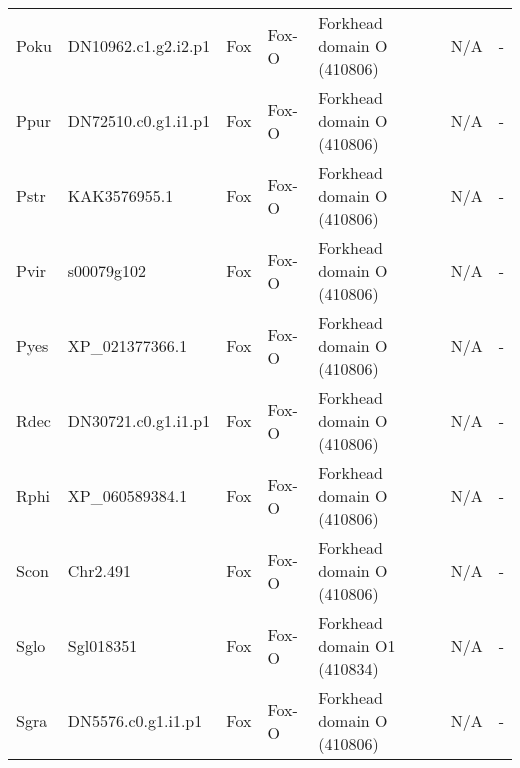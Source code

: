 \documentclass[../main.tex]{subfiles}
\begin{document}
\begin{landscape}
\begin{longtable}{lllllll}
		Poku           & DN10962.c1.g2.i2.p1   & Fox            & Fox-O               & Forkhead domain O (410806)                  & N/A                                                                    & -                    \\
		Ppur           & DN72510.c0.g1.i1.p1   & Fox            & Fox-O               & Forkhead domain O (410806)                  & N/A                                                                    & -                    \\
		Pstr           & KAK3576955.1          & Fox            & Fox-O               & Forkhead domain O (410806)                  & N/A                                                                    & -                    \\
		Pvir           & s00079g102            & Fox            & Fox-O               & Forkhead domain O (410806)                  & N/A                                                                    & -                    \\
		Pyes           & XP\_021377366.1       & Fox            & Fox-O               & Forkhead domain O (410806)                  & N/A                                                                    & -                    \\
		Rdec           & DN30721.c0.g1.i1.p1   & Fox            & Fox-O               & Forkhead domain O (410806)                  & N/A                                                                    & -                    \\
		Rphi           & XP\_060589384.1       & Fox            & Fox-O               & Forkhead domain O (410806)                  & N/A                                                                    & -                    \\
		Scon           & Chr2.491              & Fox            & Fox-O               & Forkhead domain O (410806)                  & N/A                                                                    & -                    \\
		Sglo           & Sgl018351             & Fox            & Fox-O               & Forkhead domain O1 (410834)                 & N/A                                                                    & -                    \\
		Sgra           & DN5576.c0.g1.i1.p1    & Fox            & Fox-O               & Forkhead domain O (410806)                  & N/A                                                                    & -                    \\

\end{longtable}
\end{landscape}
\end{document}
